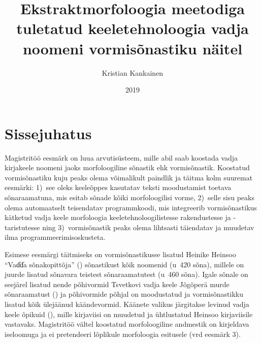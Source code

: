 \documentclass[12pt,a4paper]{article}
\begin{document}
\title{Ekstraktmorfoloogia meetodiga tuletatud keeletehnoloogia vadja noomeni vormisõnastiku näitel}
\author{Kristian Kankainen}
\date{2019}
\maketitle


\newpage
\tableofcontents




\newpage
{}
\section{Sissejuhatus}
\label{sissejuhatus}


Magistritöö eesmärk on luua arvuti\-süsteem, mille abil saab koostada vadja kirja\-keele noomeni jaoks morfoloogiline sõnastik ehk vormisõnastik. Koostatud vormisõnastiku kuju peaks olema võimalikult paindlik ja täitma kolm suuremat eesmärki: 1)~see oleks keeleõppes kasutatav teksti moodustamist toetava sõnaraamatuna, mis esitab sõnade kõiki morfoloogilisi vorme, 2)~selle sisu peaks olema automaatselt teisendatav programm\-koodi,
mis integreerib vormisõnastikus kätketud vadja keele morfoloogia keele\-tehnoloogilistesse rakendustesse ja -taristutesse ning 3)~vormisõnastik peaks olema lihtsasti täiendatav ja muudetav ilma programmeerimis\-oskusteta.

Esimese eesmärgi täitmiseks on vormi\-sõnastikusse lisatud Heinike Heinsoo \enquote{\mbox{Vad̕d̕a} sõnakopittõja} (\citeyear{heinsoo_vadsonakopittoja_2015}) sõnastikust kõik noomenid (u~420 sõna), millele on juurde lisatud sõnavara teistest sõnaraamatutest (u~460 sõna). Igale sõnale on see\-järel lisatud nende põhivormid Tsvetkovi vadja keele Jõgõperä murde sõnaraamatust (\cite{laakso_vatjan_1989}) ja põhi\-vormide põhjal on moodustatud ja vormi\-sõnastikku lisatud kõik ülejäänud käändevormid. Käänete valikus järgitakse levinud vadja keele õpikuid (\cites{heinsoo_vadsonakopittoja_2015}{konkova_vaddceeli_2014}), mille kirja\-viisi on muudetud ja ühtlustatud Heinsoo kirjaviisile vastavaks. Magistritöö vältel koostatud morfoloogiline andmestik on kirjeldava iseloomuga ja ei pretendeeri lõplikule morfoloogia esitusele (vrd eesmärk 3).
\end{document}
